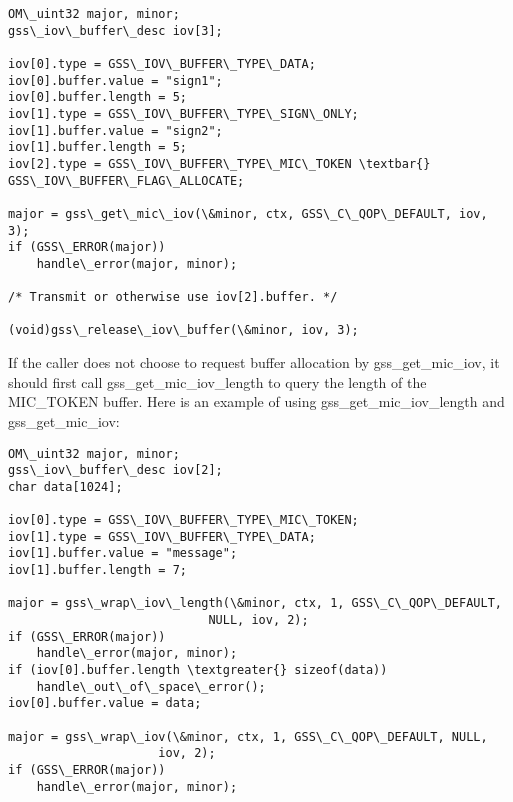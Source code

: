 \documentclass[letterpaper,10pt,english]{sphinxmanual}
\begin{document}
\begin{Verbatim}[commandchars=\\\{\}]
OM\_uint32 major, minor;
gss\_iov\_buffer\_desc iov[3];

iov[0].type = GSS\_IOV\_BUFFER\_TYPE\_DATA;
iov[0].buffer.value = "sign1";
iov[0].buffer.length = 5;
iov[1].type = GSS\_IOV\_BUFFER\_TYPE\_SIGN\_ONLY;
iov[1].buffer.value = "sign2";
iov[1].buffer.length = 5;
iov[2].type = GSS\_IOV\_BUFFER\_TYPE\_MIC\_TOKEN \textbar{} GSS\_IOV\_BUFFER\_FLAG\_ALLOCATE;

major = gss\_get\_mic\_iov(\&minor, ctx, GSS\_C\_QOP\_DEFAULT, iov, 3);
if (GSS\_ERROR(major))
    handle\_error(major, minor);

/* Transmit or otherwise use iov[2].buffer. */

(void)gss\_release\_iov\_buffer(\&minor, iov, 3);
\end{Verbatim}

If the caller does not choose to request buffer allocation by
gss\_get\_mic\_iov, it should first call gss\_get\_mic\_iov\_length to query
the length of the MIC\_TOKEN buffer.  Here is an example of using
gss\_get\_mic\_iov\_length and gss\_get\_mic\_iov:

\begin{Verbatim}[commandchars=\\\{\}]
OM\_uint32 major, minor;
gss\_iov\_buffer\_desc iov[2];
char data[1024];

iov[0].type = GSS\_IOV\_BUFFER\_TYPE\_MIC\_TOKEN;
iov[1].type = GSS\_IOV\_BUFFER\_TYPE\_DATA;
iov[1].buffer.value = "message";
iov[1].buffer.length = 7;

major = gss\_wrap\_iov\_length(\&minor, ctx, 1, GSS\_C\_QOP\_DEFAULT,
                            NULL, iov, 2);
if (GSS\_ERROR(major))
    handle\_error(major, minor);
if (iov[0].buffer.length \textgreater{} sizeof(data))
    handle\_out\_of\_space\_error();
iov[0].buffer.value = data;

major = gss\_wrap\_iov(\&minor, ctx, 1, GSS\_C\_QOP\_DEFAULT, NULL,
                     iov, 2);
if (GSS\_ERROR(major))
    handle\_error(major, minor);
\end{Verbatim}
\end{document}
